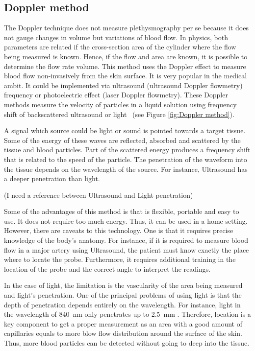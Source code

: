 \subsection{Doppler method}
\label{section literature 3.2}
The Doppler technique does not measure plethysmography per se because it does not gauge changes in volume but variations of blood flow. In physics, both parameters are related if the cross-section area of the cylinder where the flow being measured is known. Hence, if the flow and area are known, it is possible to determine the flow rate volume. This method uses the Doppler effect to measure blood flow non-invasively from the skin surface. It is very popular in the medical ambit. It could be implemented via ultrasound (ultrasound Doppler flowmetry) frequency or photoelectric effect (laser Doppler flowmetry). These Doppler methods measure the velocity of particles in a liquid solution using frequency shift of backscattered ultrasound or light~\cite{orekhova2013doppler} (see Figure \ref{fig:Doppler method}). 


A signal which source could be light or sound is pointed towards a target tissue. Some of the energy of these waves are reflected, absorbed and scattered by the tissue and blood particles. Part of the scattered energy produces a frequency shift that is related to the speed of the particle. The penetration of the waveform into the tissue depends on the wavelength of the source. For instance, Ultrasound has a deeper penetration than light. 

\rvmynote(I need a reference between Ultrasound and Light penetration)

Some of the advantages of this method is that is flexible, portable and easy to use. It does not require too much energy. Thus, it can be used in a home setting. However, there are caveats to this technology. One is that it requires precise knowledge of the body's anatomy. For instance, if it is required to measure blood flow in a major artery using Ultrasound, the patient must know exactly the place where to locate the probe. Furthermore, it requires additional training in the location of the probe and the correct angle to interpret the readings. 

In the case of light, the limitation is the vascularity of the area being measured and light's penetration. One of the principal problems of using light is that the depth of penetration depends entirely on the wavelength. For instance, light in the wavelength of \SI{840}{\nano \metre} only penetrates up to \SI{2.5}{\milli\metre} \cite{bashkatov2005optical}. Therefore, location is a key component to get a proper measurement as an area with a good amount of capillaries equals to more blow flow distribution around the surface of the skin. Thus, more blood particles can be detected without going to deep into the tissue. 

